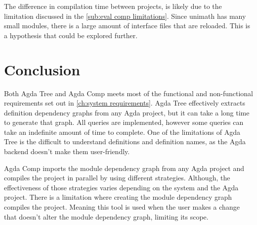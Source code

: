 The difference in compilation time between projects, is likely due to the
limitation discussed in the \cref{sub:eval comp limitations}. Since unimath has
many small modules, there is a large amount of interface files that are
reloaded. This is a hypothesis that could be explored further.

\section{Conclusion}

Both Agda Tree and Agda Comp meets most of the functional and non-functional
requirements set out in \cref{ch:system requirements}. Agda Tree effectively
extracts definition dependency graphs from any Agda project, but it can take a
long time to generate that graph. All queries are implemented, however some
queries can take an indefinite amount of time to complete. One of the
limitations of Agda Tree is the difficult to understand definitions and
definition names, as the Agda backend doesn't make them user-friendly.

Agda Comp imports the module dependency graph from any Agda project and
compiles the project in parallel by using different strategies. Although, the
effectiveness of those strategies varies depending on the system and the Agda
project. There is a limitation where creating the module dependency graph
compiles the project. Meaning this tool is used when the user makes a change
that doesn't alter the module dependency graph, limiting its scope.




